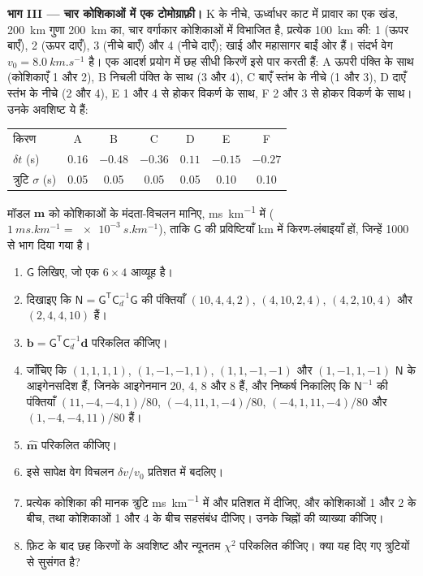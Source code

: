 \begin{problem}[{सप्ताहांत समस्या --- किरणें, लव तरंगें और लघु
टोमोग्राफ़ी, एक काल्पनिक स्टेशन के नीचे}]
\noindent\textbf{भाग III --- चार कोशिकाओं में एक टोमोग्राफ़ी।} K के नीचे, ऊर्ध्वाधर काट में प्रावार का एक खंड,
\qty{200}{km} गुणा \qty{200}{km} का, चार वर्गाकार कोशिकाओं में विभाजित है,
प्रत्येक \qty{100}{km} की: 1 (ऊपर बाएँ), 2 (ऊपर दाएँ), 3 (नीचे बाएँ)
और 4 (नीचे दाएँ); खाई और महासागर बाईं ओर हैं। संदर्भ वेग $v_0 = \qty{8.0}{km.s^{-1}}$ है।
एक आदर्श प्रयोग में छह सीधी किरणें इसे पार करती हैं: A ऊपरी पंक्ति के साथ (कोशिकाएँ 1
और 2), B निचली पंक्ति के साथ (3 और 4), C बाएँ स्तंभ के नीचे (1 और 3), D
दाएँ स्तंभ के नीचे (2 और 4), E 1 और 4 से होकर विकर्ण के साथ, F 2 और 3 से होकर
विकर्ण के साथ। उनके अवशिष्ट ये हैं:
\begin{center}
\small
\begin{tabular}{lcccccc}
\hline
किरण & A & B & C & D & E & F \\
$\delta t$ (\unit{s}) & $0.16$ & $-0.48$ & $-0.36$ & $0.11$ & $-0.15$ & $-0.27$ \\
त्रुटि $\sigma$ (\unit{s}) & 0.05 & 0.05 & 0.05 & 0.05 & 0.10 & 0.10 \\
\hline
\end{tabular}
\end{center}
मॉडल $\mathbf m$ को कोशिकाओं के मंदता-विचलन मानिए,
\unit{ms.km^{-1}} में ($\qty{1}{ms.km^{-1}} = \qty{e-3}{s.km^{-1}}$), ताकि $\mathsf G$ की प्रविष्टियाँ
\unit{km} में किरण-लंबाइयाँ हों, जिन्हें 1000 से भाग दिया गया है।
\begin{enumerate}[resume]
  \item $\mathsf G$ लिखिए, जो एक $6\times4$ आव्यूह है।
  \item दिखाइए कि $\mathsf N = \mathsf G^{\mathsf T}\mathsf C_d^{-1}\mathsf G$
        की पंक्तियाँ $(10, 4, 4, 2)$, $(4, 10, 2, 4)$, $(4, 2, 10, 4)$ और
        $(2, 4, 4, 10)$ हैं।
  \item $\mathbf b = \mathsf G^{\mathsf T}\mathsf C_d^{-1}\mathbf d$ परिकलित कीजिए।
  \item जाँचिए कि $(1,1,1,1)$, $(1,-1,-1,1)$, $(1,1,-1,-1)$ और $(1,-1,1,-1)$
        $\mathsf N$ के आइगेनसदिश हैं, जिनके आइगेनमान 20, 4, 8 और 8 हैं, और
        निष्कर्ष निकालिए कि $\mathsf N^{-1}$ की पंक्तियाँ $(11, -4, -4, 1)/80$,
        $(-4, 11, 1, -4)/80$, $(-4, 1, 11, -4)/80$ और $(1, -4, -4, 11)/80$ हैं।
  \item {} $\hat{\mathbf m}$ परिकलित कीजिए।
  \item इसे सापेक्ष वेग विचलन $\delta v/v_0$ प्रतिशत में बदलिए।
  \item प्रत्येक कोशिका की मानक त्रुटि \unit{ms.km^{-1}} में और प्रतिशत में दीजिए,
        और कोशिकाओं 1 और 2 के बीच, तथा कोशिकाओं 1 और 4 के बीच सहसंबंध दीजिए।
        उनके चिह्नों की व्याख्या कीजिए।
  \item फ़िट के बाद छह किरणों के अवशिष्ट और न्यूनतम
        $\chi^2$ परिकलित कीजिए। क्या यह दिए गए त्रुटियों से सुसंगत है?
\end{enumerate}


\end{problem}
